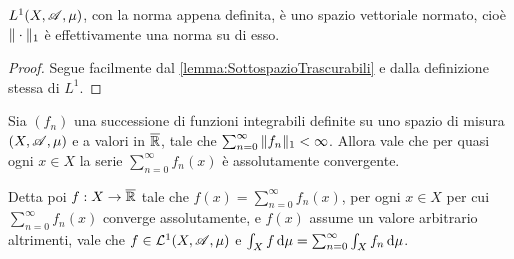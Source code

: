 \begin{remark}
	$L^1(X,\mathscr A,\mu)$, con la norma appena definita, è uno spazio vettoriale normato, cioè $\Vert \cdot\Vert_1$ è effettivamente una norma su di esso.
\end{remark}
\begin{proof}
	Segue facilmente dal \cref{lemma:SottospazioTrascurabili} e dalla definizione stessa di $L^1$.
\end{proof}


\begin{theorem}\label{thm:IntegrazionePerSerie}
	Sia $(f_n)$ una successione di funzioni integrabili definite su uno spazio di misura $(X,\mathscr A,\mu)$ e a valori in $\overline{\mathbb R}$, tale che $\sum_{n=0}^{\infty}\Vert f_n\Vert_1<\infty$. Allora vale che per quasi ogni $x\in X$ la serie $\sum_{n=0}^\infty f_n(x)$ è assolutamente convergente. 
	
	Detta poi $f:X\to\overline{\mathbb R}$ tale che $f(x)=\sum_{n=0}^\infty f_n(x)$, per ogni $x\in X$ per cui $\sum_{n=0}^\infty f_n(x)$ converge assolutamente, e $f(x)$ assume un valore arbitrario altrimenti, vale che $f\in \mathcal L^1(X,\mathscr A,\mu)$ e $\int_X f\,\mathrm d\mu=\sum_{n=0}^\infty \int_X f_n\,\mathrm d\mu$.
\end{theorem}

